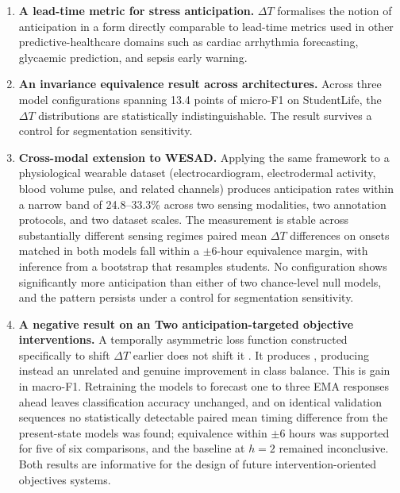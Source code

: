 \documentclass[preprint,12pt,authoryear]{elsarticle}
\newcommand{\dt}{$\Delta T$}
\providecommand{\DIFaddtex}[1]{{\protect\color{blue} \sf #1}} %
\providecommand{\DIFdeltex}[1]{{\protect\color{red} \scriptsize #1}} %
\providecommand{\DIFaddbegin}{} %
\providecommand{\DIFaddend}{} %
\providecommand{\DIFdelbegin}{} %
\providecommand{\DIFdelend}{} %
\providecommand{\DIFadd}[1]{\texorpdfstring{\DIFaddtex{#1}}{#1}} %
\providecommand{\DIFdel}[1]{\texorpdfstring{\DIFdeltex{#1}}{}} %
\newcommand{\DIFscaledelfig}{0.5}
\newlength{\DIFdelgraphicswidth} %
\newlength{\DIFdelgraphicsheight} %
\newcommand{\DIFaddincludegraphics}[2][]{{\color{blue}\fbox{\DIFOincludegraphics[#1]{#2}}}} %
\newcommand{\DIFdelincludegraphics}[2][]{%
\sbox{\DIFdelgraphicsbox}{\DIFOincludegraphics[#1]{#2}}%
\settoboxwidth{\DIFdelgraphicswidth}{\DIFdelgraphicsbox} %
\settoboxtotalheight{\DIFdelgraphicsheight}{\DIFdelgraphicsbox} %
\scalebox{\DIFscaledelfig}{%
\parbox[b]{\DIFdelgraphicswidth}{\usebox{\DIFdelgraphicsbox}\\[-\baselineskip] \rule{\DIFdelgraphicswidth}{0em}}\llap{\resizebox{\DIFdelgraphicswidth}{\DIFdelgraphicsheight}{%
\setlength{\unitlength}{\DIFdelgraphicswidth}%
\begin{picture}(1,1)%
\thicklines\linethickness{2pt} %
{\color[rgb]{1,0,0}\put(0,0){\framebox(1,1){}}}%
{\color[rgb]{1,0,0}\put(0,0){\line( 1,1){1}}}%
{\color[rgb]{1,0,0}\put(0,1){\line(1,-1){1}}}%
\end{picture}%
}\hspace*{3pt}}} %
} %
\DeclareRobustCommand{\DIFaddbegin}{\DIFOaddbegin \let\includegraphics\DIFaddincludegraphics} %
\DeclareRobustCommand{\DIFaddend}{\DIFOaddend \let\includegraphics\DIFOincludegraphics} %
\DeclareRobustCommand{\DIFdelbegin}{\DIFOdelbegin \let\includegraphics\DIFdelincludegraphics} %
\DeclareRobustCommand{\DIFdelend}{\DIFOaddend \let\includegraphics\DIFOincludegraphics} %
\begin{document}
\begin{enumerate}

\item \textbf{A lead-time metric for stress anticipation.} \dt{}
formalises the notion of anticipation in a form directly comparable to
lead-time metrics used in other predictive-healthcare domains such as
cardiac arrhythmia forecasting, glycaemic prediction, and sepsis
early warning.

\item \textbf{An \DIFdelbegin \DIFdel{invariance }\DIFdelend \DIFaddbegin \DIFadd{equivalence }\DIFaddend result across architectures.} Across
three model configurations spanning \DIFdelbegin \DIFdel{13.4 }\DIFdelend \DIFaddbegin \DIFadd{13.3 }\DIFaddend points of micro-F1 on
StudentLife, \DIFdelbegin \DIFdel{the \dt{} distributions are statistically indistinguishable. The result
survives a control for segmentation sensitivity.
}%

\item%
\DIFdel{\textbf{Cross-modal extension to WESAD.} Applying the same
framework to a physiological wearable dataset (electrocardiogram,
electrodermal activity, blood volume pulse, and related channels)
produces anticipation rates within a narrow band of 24.8--33.3\% across
two sensing modalities, two annotation protocols, and two dataset
scales. The measurement is stable across substantially different
sensing regimes}\DIFdelend \DIFaddbegin \DIFadd{paired mean \dt{} differences on onsets matched in both
models fall within a $\pm 6$-hour equivalence margin, with inference
from a bootstrap that resamples students. No configuration shows
significantly more anticipation than either of two chance-level null
models, and the pattern persists under a control for segmentation
sensitivity}\DIFaddend .

\item \textbf{\DIFdelbegin \DIFdel{A negative result on an }\DIFdelend \DIFaddbegin \DIFadd{Two }\DIFaddend anticipation-targeted \DIFdelbegin \DIFdel{objective}\DIFdelend \DIFaddbegin \DIFadd{interventions}\DIFaddend .} A temporally
asymmetric loss function constructed specifically to shift \dt{}
earlier does not shift it\DIFdelbegin \DIFdel{. It produces }\DIFdelend \DIFaddbegin \DIFadd{, producing }\DIFaddend instead an unrelated \DIFdelbegin \DIFdel{and
genuine improvement in
class balance. This is }\DIFdelend \DIFaddbegin \DIFadd{gain in
macro-F1. Retraining the models to forecast one to three EMA responses
ahead leaves classification accuracy unchanged, and on identical
validation sequences no statistically detectable paired mean timing
difference from the present-state models was found; equivalence within
$\pm 6$ hours was supported for five of six comparisons, and the
baseline at $h = 2$ remained inconclusive. Both results are }\DIFaddend informative
for the design of future intervention-oriented \DIFdelbegin \DIFdel{objectives}\DIFdelend \DIFaddbegin \DIFadd{systems}\DIFaddend .


\end{enumerate}
\end{document}
